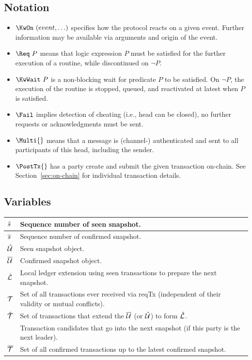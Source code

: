 \subsection{Notation}
\begin{itemize}
  \item $\KwOn~(event,\ldots)$ specifies how the protocol reacts on a given event. Further information may be available via arguments and origin of the event.
  \item $\Req~P$ means that logic expression $P$ must be satisfied for the further execution of
        a routine, while discontinued on $\neg P$.
  \item $\KwWait~P$ is a  non-blocking wait for
predicate $P$ to be satisfied. On $\neg P$, the execution of the
routine is stopped, queued, and reactivated at latest when $P$ is
satisfied.
  \item $\Fail$ implies detection of cheating (i.e., head can be closed), no
        further requests or acknowledgments must be sent.
  \item $\Multi{}$ means that a message is (channel-) authenticated and sent to all participants of this head, including the sender.
  \item $\PostTx{}$ has a party create and submit the given transaction on-chain. See Section~\ref{sec:on-chain} for individual transaction details.
\end{itemize}


\subsection{Variables}

\begin{center}
\begin{tabular}{|l|l|}\hline
  $\hat s$  & Sequence number of seen snapshot. \\ \hline
  $\overline s$  & Sequence number of confirmed snapshot. \\ \hline
  $\hat {\mathcal U}$ & Seen snapshot object. \\ \hline
  $\overline {\mathcal U}$ & Confirmed snapshot object. \\ \hline
  $\hat {\mathcal L}$ & Local ledger extension using seen transactions to prepare the next snapshot.\\ \hline
  ${\mathcal T}$    & Set of all transactions ever received via reqTx (independent of their validity or mutual conflicts).\\  \hline
  $\hat {\mathcal T}$ & Set of transactions that extend the $\overline {\mathcal U}$ (or $\hat {\mathcal U}$) to form $\hat {\mathcal L}$. \\
           & Transaction candidates that go into the next snapshot (if this party is the next leader).\\ \hline
  $\overline {\mathcal T}$ & Set of all confirmed transactions up to the latest confirmed snapshot.\\  \hline
\end{tabular}
\end{center}

